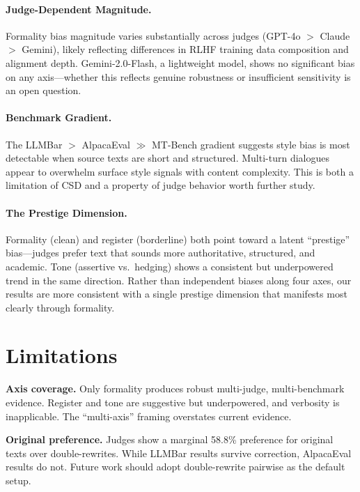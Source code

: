 \documentclass[11pt,a4paper]{article}
\begin{document}
\paragraph{Judge-Dependent Magnitude.}
Formality bias magnitude varies substantially across judges (GPT-4o $>$ Claude $>$ Gemini), likely reflecting differences in RLHF training data composition and alignment depth.
Gemini-2.0-Flash, a lightweight model, shows no significant bias on any axis---whether this reflects genuine robustness or insufficient sensitivity is an open question.

\paragraph{Benchmark Gradient.}
The LLMBar $>$ AlpacaEval $\gg$ MT-Bench gradient suggests style bias is most detectable when source texts are short and structured.
Multi-turn dialogues appear to overwhelm surface style signals with content complexity.
This is both a limitation of CSD and a property of judge behavior worth further study.

\paragraph{The Prestige Dimension.}
Formality (clean) and register (borderline) both point toward a latent ``prestige'' bias---judges prefer text that sounds more authoritative, structured, and academic.
Tone (assertive vs.\ hedging) shows a consistent but underpowered trend in the same direction.
Rather than independent biases along four axes, our results are more consistent with a single prestige dimension that manifests most clearly through formality.

\section{Limitations}
\label{sec:limitations}

\textbf{Axis coverage.} Only formality produces robust multi-judge, multi-benchmark evidence. Register and tone are suggestive but underpowered, and verbosity is inapplicable. The ``multi-axis'' framing overstates current evidence.

\textbf{Original preference.} Judges show a marginal 58.8\% preference for original texts over double-rewrites. While LLMBar results survive correction, AlpacaEval results do not. Future work should adopt double-rewrite pairwise as the default setup.
\end{document}
